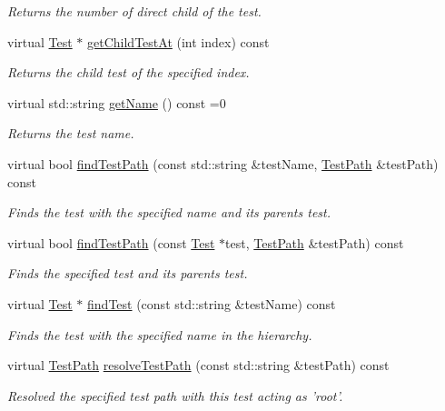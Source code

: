 \begin{DoxyCompactItemize}
\begin{DoxyCompactList}\small\item\em Returns the number of direct child of the test. \end{DoxyCompactList}\item 
virtual \hyperlink{class_test}{Test} $\ast$ \hyperlink{class_test_aad295af3b440fdec4bd95ddd422466b8}{get\+Child\+Test\+At} (int index) const 
\begin{DoxyCompactList}\small\item\em Returns the child test of the specified index. \end{DoxyCompactList}\item 
virtual std\+::string \hyperlink{class_test_a5e024da199f811a33264e432c21dcc94}{get\+Name} () const =0
\begin{DoxyCompactList}\small\item\em Returns the test name. \end{DoxyCompactList}\item 
virtual bool \hyperlink{class_test_a609b4d93fde2f4fa5b4177c1e1a002ff}{find\+Test\+Path} (const std\+::string \&test\+Name, \hyperlink{class_test_path}{Test\+Path} \&test\+Path) const 
\begin{DoxyCompactList}\small\item\em Finds the test with the specified name and its parents test. \end{DoxyCompactList}\item 
virtual bool \hyperlink{class_test_a9f0c1e40c1378f596bd5effd3a034652}{find\+Test\+Path} (const \hyperlink{class_test}{Test} $\ast$test, \hyperlink{class_test_path}{Test\+Path} \&test\+Path) const 
\begin{DoxyCompactList}\small\item\em Finds the specified test and its parents test. \end{DoxyCompactList}\item 
virtual \hyperlink{class_test}{Test} $\ast$ \hyperlink{class_test_a4182e55e98622e6daf5460e5c948dc82}{find\+Test} (const std\+::string \&test\+Name) const 
\begin{DoxyCompactList}\small\item\em Finds the test with the specified name in the hierarchy. \end{DoxyCompactList}\item 
virtual \hyperlink{class_test_path}{Test\+Path} \hyperlink{class_test_aaa1f5a8b47a9ad4feed4603c7e56758c}{resolve\+Test\+Path} (const std\+::string \&test\+Path) const 
\begin{DoxyCompactList}\small\item\em Resolved the specified test path with this test acting as 'root'. \end{DoxyCompactList}\end{DoxyCompactItemize}
